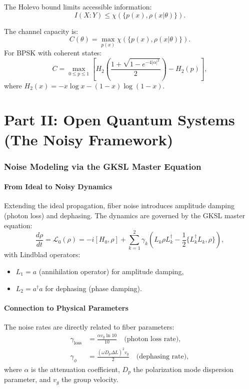 \documentclass[12pt]{article}
\newcommand{\Lgen}{\mathcal{L}}
\begin{document}
The Holevo bound limits accessible information:
\begin{equation}
    I(X:Y) \leq \chi(\{p(x), \rho(x|\theta)\}).
\end{equation}

The channel capacity is:
\begin{equation}
    C(\theta) = \max_{p(x)} \chi(\{p(x), \rho(x|\theta)\}).
\end{equation}
For BPSK with coherent states:
\begin{equation}
    C = \max_{0 \leq p \leq 1} \left[ H_2\left( \frac{1 + \sqrt{1 - e^{-4|\alpha|^2}}}{2} \right) - H_2(p) \right],
\end{equation}
where $H_2(x) = -x\log x - (1-x)\log(1-x)$.

\part*{Part II: Open Quantum Systems (The Noisy Framework)}

\section{Noise Modeling via the GKSL Master Equation}
\subsection{From Ideal to Noisy Dynamics}
Extending the ideal propagation, fiber noise introduces amplitude damping (photon loss) and dephasing. The dynamics are governed by the GKSL master equation:
\begin{equation}
    \frac{d\rho}{dt} = \Lgen_0(\rho) = -i[H_0, \rho] + \sum_{k=1}^2 \gamma_k \left( L_k \rho L_k^\dagger - \frac{1}{2} \{ L_k^\dagger L_k, \rho \} \right),
\end{equation}
with Lindblad operators:
\begin{itemize}
    \item $L_1 = a$ (annihilation operator) for amplitude damping,
    \item $L_2 = a^\dagger a$ for dephasing (phase damping).
\end{itemize}

\subsection{Connection to Physical Parameters}
The noise rates are directly related to fiber parameters:
\begin{align}
    \gamma_{\text{loss}} &= \frac{\alpha v_g \ln 10}{10} \quad \text{(photon loss rate)}, \\
    \gamma_{\phi} &= \frac{(\omega D_p \Delta L)^2 v_g}{2} \quad \text{(dephasing rate)},
\end{align}
where $\alpha$ is the attenuation coefficient, $D_p$ the polarization mode dispersion parameter, and $v_g$ the group velocity.
\end{document}
